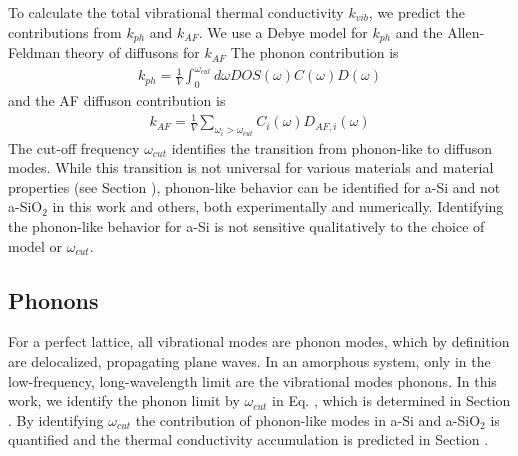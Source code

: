 \documentclass[aps,prb,twocolumn,superscriptaddress,footinbib,amsmath,amssymb,floatfix]{revtex4}
\begin{document}
To calculate the total vibrational thermal conductivity $k_{vib}$, we predict 
the contributions from $k_{ph}$ and $k_{AF}$. We use a Debye model 
for $k_{ph}$\cite{ashcroft} and the Allen-Feldman theory of diffusons 
for $k_{AF}$\cite{feldman_thermal_1993,feldman_numerical_1999}
The phonon contribution is
\begin{equation}\label{EQ:kvib2}
\begin{split}
k_{ph} = \frac{1}{V}\int_{0}^{\omega_{cut}} 
d\omega DOS(\omega) C(\omega) D(\omega)
\end{split}
\end{equation}
and the AF diffuson contribution is
\begin{equation}\label{EQ:kvib2}
\begin{split}
k_{AF} = \frac{1}{V}\sum_{\omega_i>\omega_{cut}} C_i(\omega) D_{AF,i}(\omega) 
\end{split}
\end{equation}
The cut-off frequency $\omega_{cut}$ identifies the transition from 
phonon-like to diffuson modes.
\cite{feldman_thermal_1993,feldman_numerical_1999,liu_high_2009} 
While this transition is not universal for 
various materials and material properties (see Section ), 
phonon-like behavior 
can be identified for a-Si and not a-SiO$_2$ in this work and others, 
both experimentally
\cite{liu_high_2009,yang_anomalously_2010,minnich_thermal_2011,
regner_broadband_2013} 
and numerically.
\cite{feldman_thermal_1993,feldman_numerical_1999,
mcgaughey_thermal_2004,he_heat_2011} 
Identifying the phonon-like behavior for a-Si is not sensitive 
qualitatively to the choice of model
\cite{feldman_thermal_1993,feldman_numerical_1999,liu_high_2009} 
or $\omega_{cut}$.
\cite{feldman_thermal_1993,feldman_numerical_1999,
donadio_atomistic_2009,liu_high_2009,yang_anomalously_2010}

\subsection{\label{S:Theory:Thermal:Phonons}Phonons}

For a perfect lattice, 
all vibrational modes are phonon modes, which by 
definition are delocalized, propagating plane waves.
\cite{ziman_electrons_2001} In an amorphous system, only in the 
low-frequency, long-wavelength limit are the vibrational modes phonons. 
In this work, we identify the phonon limit by $\omega_{cut}$ in Eq. , 
which is determined in Section . By identifying $\omega_{cut}$  
the contribution of phonon-like modes in a-Si and 
a-SiO$_2$ is quantified and the thermal conductivity accumulation 
is predicted in Section .  
\end{document}
